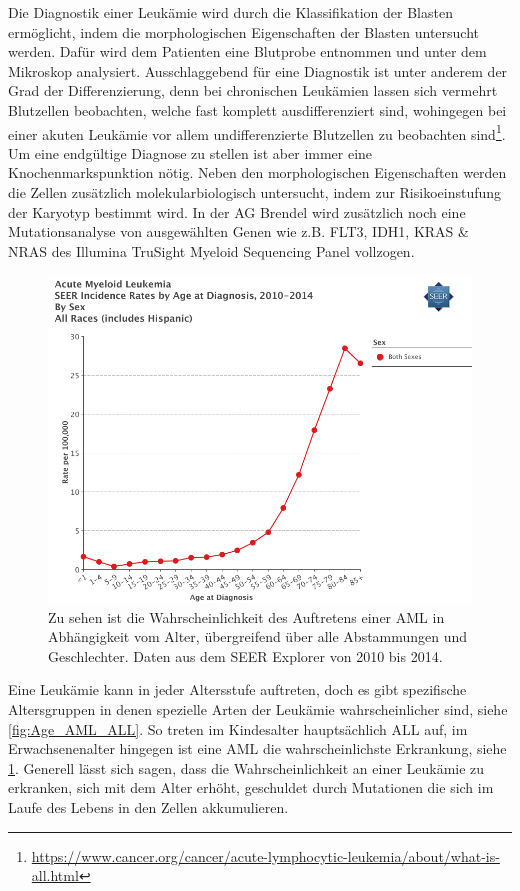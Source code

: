 Die Diagnostik einer Leukämie wird durch die Klassifikation der Blasten ermöglicht, indem die morphologischen Eigenschaften der Blasten untersucht werden. Dafür wird dem Patienten eine Blutprobe entnommen und unter dem Mikroskop analysiert. Ausschlaggebend für eine Diagnostik ist unter anderem der Grad der Differenzierung, denn bei chronischen Leukämien lassen sich vermehrt Blutzellen beobachten, welche fast komplett ausdifferenziert sind, wohingegen bei einer akuten Leukämie vor allem undifferenzierte Blutzellen zu beobachten sind\footnote{\url{https://www.cancer.org/cancer/acute-lymphocytic-leukemia/about/what-is-all.html}}. Um eine endgültige Diagnose zu stellen ist aber immer eine Knochenmarkspunktion nötig. Neben den morphologischen Eigenschaften werden die Zellen zusätzlich molekularbiologisch untersucht, indem zur Risikoeinstufung der Karyotyp bestimmt wird. In der AG Brendel wird zusätzlich noch eine Mutationsanalyse von ausgewählten Genen wie z.B. FLT3, IDH1, KRAS \& NRAS des Illumina TruSight Myeloid Sequencing Panel vollzogen.

\begin{figure}
\centering
\includegraphics[width=.95\textwidth]{images/Alter_AML_2014.png}
\caption{Zu sehen ist die Wahrscheinlichkeit des Auftretens einer \ac{AML} in Abhängigkeit vom Alter, übergreifend über alle Abstammungen und Geschlechter. Daten aus dem SEER\cite{Howlader.2014} Explorer\protect\footnotemark{} von 2010 bis 2014.}
\label{fig:Alter_AML}
\end{figure}
Eine Leukämie kann in jeder Altersstufe auftreten, doch es gibt spezifische Altersgruppen in denen spezielle Arten der Leukämie wahrscheinlicher sind, siehe \ref{fig:Age_AML_ALL}. So treten im Kindesalter hauptsächlich \ac{ALL} auf\cite{Rubnitz.2012}, im Erwachsenenalter hingegen ist eine \ac{AML} die wahrscheinlichste Erkrankung, siehe \ref{fig:Alter_AML}. Generell lässt sich sagen, dass die Wahrscheinlichkeit an einer Leukämie zu erkranken, sich mit dem Alter erhöht, geschuldet durch Mutationen die sich im Laufe des Lebens in den Zellen akkumulieren.

